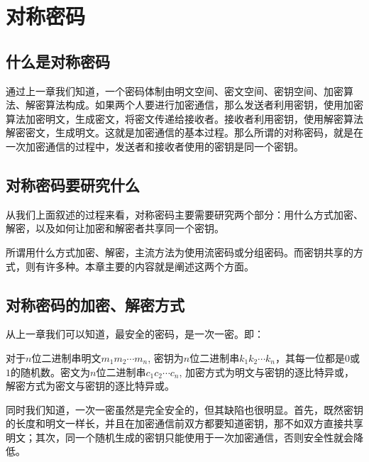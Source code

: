 \chapter{对称密码}
\section{什么是对称密码}
通过上一章我们知道，一个密码体制由明文空间、密文空间、密钥空间、加密算法、解密算法构成。如果两个人要进行加密通信，那么发送者利用密钥，使用加密算法加密明文，生成密文，将密文传递给接收者。接收者利用密钥，使用解密算法解密密文，生成明文。这就是加密通信的基本过程。那么所谓的对称密码，就是在一次加密通信的过程中，发送者和接收者使用的密钥是同一个密钥。
\section{对称密码要研究什么}
从我们上面叙述的过程来看，对称密码主要需要研究两个部分：用什么方式加密、解密，以及如何让加密和解密者共享同一个密钥。\par
所谓用什么方式加密、解密，主流方法为使用流密码或分组密码。而密钥共享的方式，则有许多种。本章主要的内容就是阐述这两个方面。
\section{对称密码的加密、解密方式}
从上一章我们可以知道，最安全的密码，是一次一密。即：\par
对于$n$位二进制串明文$m_1m_2\cdots m_n$, 密钥为$n$位二进制串$k_1k_2\cdots k_n$，其每一位都是$0$或$1$的随机数。密文为$n$位二进制串$c_1c_2\cdots c_n$, 加密方式为明文与密钥的逐比特异或，解密方式为密文与密钥的逐比特异或。\par
同时我们知道，一次一密虽然是完全安全的，但其缺陷也很明显。首先，既然密钥的长度和明文一样长，并且在加密通信前双方都要知道密钥，那不如双方直接共享明文；其次，同一个随机生成的密钥只能使用于一次加密通信，否则安全性就会降低。